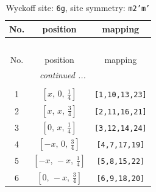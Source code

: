 \documentclass[fleqn,8pt]{jsarticle}
\begin{document}
\renewcommand{\arraystretch}{1.2}
\begin{longtable}{ccc}
\caption{Wyckoff site: {\tt 6g}, site symmetry: {\tt m2'm'}}
 \\
 \hline \hline
No. & position & mapping \\ \hline \endfirsthead

\multicolumn{2}{l}{\tablename\ \thetable{}} \\
 \hline \hline
No. & position & mapping \\ \hline \endhead

 \hline \hline
\multicolumn{2}{r}{\footnotesize\it continued ...} \\ \endfoot

 \hline \hline
\multicolumn{2}{r}{} \\ \endlastfoot

1 & $\left[ x,\, 0,\, \frac{1}{4} \right]$ & {\tt [1,10,13,23]} \\ \hline
2 & $\left[ x,\, x,\, \frac{3}{4} \right]$ & {\tt [2,11,16,21]} \\ \hline
3 & $\left[ 0,\, x,\, \frac{1}{4} \right]$ & {\tt [3,12,14,24]} \\ \hline
4 & $\left[ - x,\, 0,\, \frac{3}{4} \right]$ & {\tt [4,7,17,19]} \\ \hline
5 & $\left[ - x,\, - x,\, \frac{1}{4} \right]$ & {\tt [5,8,15,22]} \\ \hline
6 & $\left[ 0,\, - x,\, \frac{3}{4} \right]$ & {\tt [6,9,18,20]} \\
\end{longtable}
\renewcommand{\arraystretch}{1.2}
\end{document}
